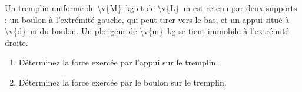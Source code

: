 Un tremplin uniforme de \qty{\v{M}}{kg} et de \qty{\v{L}}{m} est retenu par deux supports : un boulon à l'extrémité gauche, qui peut tirer vers le bas, et un appui situé à \qty{\v{d}}{m} du boulon. Un plongeur de \qty{\v{m}}{kg} se tient immobile à l'extrémité droite.

\begin{center}
\end{center}

\begin{enumerate}[label=\alph*)]
    \item Déterminez la force exercée par l'appui sur le tremplin.
    \item Déterminez la force exercée par le boulon sur le tremplin.
\end{enumerate}
